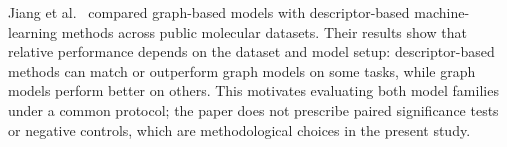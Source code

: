 Jiang et al.~\cite{jiang2021could} compared graph-based models with descriptor-based machine-learning methods across public molecular datasets. Their results show that relative performance depends on the dataset and model setup: descriptor-based methods can match or outperform graph models on some tasks, while graph models perform better on others. This motivates evaluating both model families under a common protocol; the paper does not prescribe paired significance tests or negative controls, which are methodological choices in the present study.

